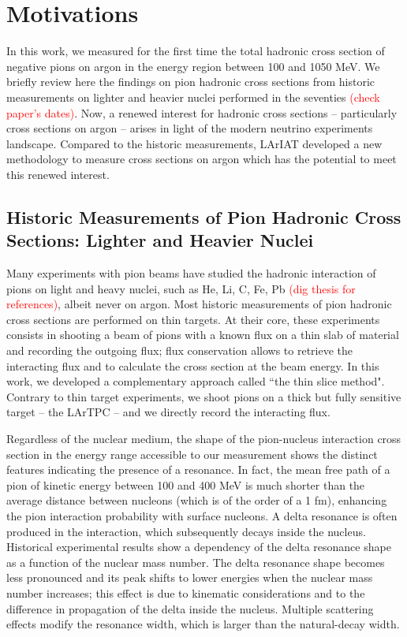 \documentclass[aps,prl,twocolumn,showpacs,superscriptaddress,groupedaddress]{revtex4}  %
\begin{document}
\newpage
\section{\label{sec:Motivations}Motivations}
In this work, we measured  for the first time the total hadronic cross section of negative pions on argon in the energy region between 100 and 1050 MeV. We briefly review here the findings on pion hadronic cross sections from historic measurements on lighter and heavier nuclei performed in the seventies \textcolor{red}{(check paper's dates)}.  Now, a renewed interest for hadronic cross sections -- particularly cross sections on argon -- arises in light of the modern neutrino experiments landscape. Compared to the historic measurements, LArIAT developed a new  methodology to measure cross sections on argon which has the potential to meet this renewed interest. 

\subsection{Historic Measurements of Pion Hadronic Cross Sections: Lighter and Heavier Nuclei}
Many experiments with pion beams have studied the hadronic interaction of pions on light and heavy nuclei, such as  He, Li, C, Fe, Pb \cite{PhysRevC.14.635} \textcolor{red}{(dig thesis for references)}, albeit never on argon.  Most historic measurements of pion hadronic cross sections are performed on thin targets. At their core, these experiments consists in shooting a beam of pions with a known flux on a thin slab of material and recording the outgoing flux; flux conservation allows to retrieve the interacting flux and to calculate the cross section at the beam energy.
In this work, we developed a complementary approach called ``the thin slice method". Contrary to thin target experiments, we shoot pions on a thick but fully sensitive target  -- the LArTPC -- and we directly record the interacting flux. 

Regardless of the nuclear medium, the shape of the pion-nucleus interaction cross section in the energy range accessible to our measurement shows the distinct features indicating the presence of a resonance. In fact, the mean free path of a pion of kinetic energy between 100 and 400 MeV is much shorter than the average distance between nucleons (which is of the order of a
 1 fm),   enhancing the pion interaction probability with surface nucleons. A delta resonance is often produced in the interaction, which subsequently decays inside the nucleus.
Historical experimental results show a dependency of the delta resonance shape as a function of the nuclear mass number. The delta resonance shape becomes less pronounced  
and its peak shifts to lower energies when the nuclear mass number increases; this effect is due to kinematic considerations and to the difference in propagation of the delta inside the nucleus. Multiple scattering effects modify the resonance width, which is larger than the natural-decay width.
\end{document}
